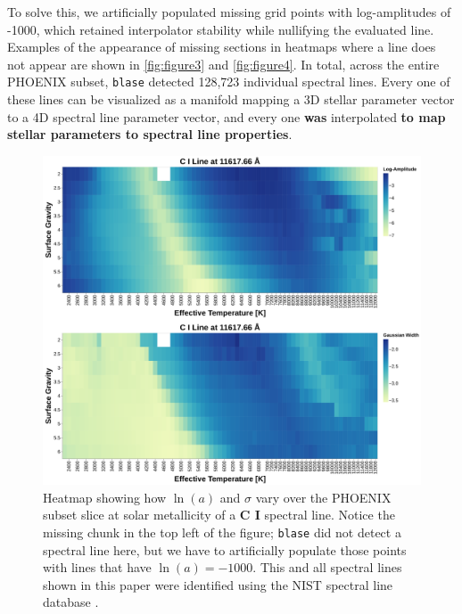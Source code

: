 \documentclass[twocolumn, linenumbers]{aastex631}
\begin{document}
To solve this, we artificially populated missing grid points with log-amplitudes of -1000, which retained interpolator stability while nullifying the evaluated line.
Examples of the appearance of missing sections in heatmaps where a line does not appear are shown in \autoref{fig:figure3} and \autoref{fig:figure4}.
In total, across the entire PHOENIX subset, \texttt{blase} detected 128,723 individual spectral lines.
Every one of these lines can be visualized as a manifold mapping a 3D stellar parameter vector to a 4D spectral line parameter vector, and every one \textbf{was} interpolated \textbf{to map stellar parameters to spectral line properties}.
\begin{figure}
    \centering
    \includegraphics[width=\textwidth]{figure3}
    \caption{Heatmap showing how $\ln(a)$ and $\sigma$ vary over the PHOENIX subset slice at solar metallicity of a \textbf{C I} spectral line.
    Notice the missing chunk in the top left of the figure; \texttt{blase} did not detect a spectral line here, but we have to artificially populate those points with lines that have $\ln(a) = -1000$.
    This and all spectral lines shown in this paper were identified using the NIST spectral line database \citep{NIST}.}
    \label{fig:figure3}
\end{figure}
\end{document}
